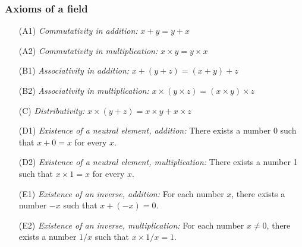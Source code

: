 \documentclass{article}
\begin{document}
\subsubsection{Axioms of a field}
\begin{enumerate}
\setlength\itemsep{0.1em}
    \item[(A1)] \textit{Commutativity in addition:} $x + y = y + x$
    \item[(A2)] \textit{Commutativity in multiplication:} $x \times y = y \times x$
    \item[(B1)] \textit{Associativity in addition:} $x + (y + z) = (x + y) + z$ 
    \item[(B2)] \textit{Associativity in multiplication:} $x \times (y\times z) = (x\times y) \times z$ 
    \item[(C)] \textit{Distributivity:} $x \times (y + z) = x \times y + x \times z$
    \item[(D1)]\textit{Existence of a neutral element, addition:} There exists a number 0 such that $x + 0 = x$ for every $x$.
    \item[(D2)] \textit{Existence of a neutral element, multiplication:} There exists a number 1 such that $x \times 1 = x$ for every $x$. 
    \item[(E1)]\textit{Existence of an inverse, addition:} For each number $x$, there exists a number $-x$ such that $x + (-x) = 0$.
     \item[(E2)]\textit{Existence of an inverse, multiplication:} For each number $x \neq 0$, there exists a number $1/x$ such that $x \times 1/x = 1$.
\end{enumerate}

%
\end{document}
